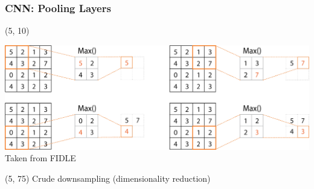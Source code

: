 \begin{frame}[label=Pooling_Layers]
  \frametitle{\acl{CNN}: Pooling Layers}

  \begin{textblock}{90}(5, 10)
    \begin{center}
      \includegraphics[width=\textwidth]{img/CNN_Pooling.png}
      Taken from FIDLE
    \end{center}
  \end{textblock}

  \begin{textblock}{90}(5, 75)
    Crude downsampling (dimensionality reduction)\\
    \hyperlink{CNN_Overview_Pooling}{}
  \end{textblock}
\end{frame}
